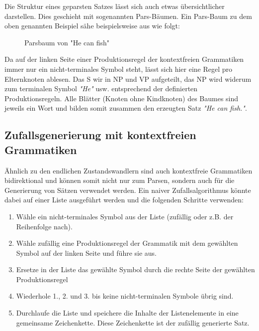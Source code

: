 \documentclass[12pt]{report}
\begin{document}
Die Struktur eines geparsten Satzes lässt sich auch etwas übersichtlicher darstellen. Dies geschieht mit sogenannten Pars-Bäumen. Ein Pars-Baum zu dem oben genannten Beispiel sähe beispielsweise aus wie folgt:
\begin{figure}
\begin{center}
\caption{Parsbaum von "He can fish"}
\end{center}
\end{figure}

Da auf der linken Seite einer Produktionsregel der kontextfreien Grammatiken immer nur ein nicht-terminales Symbol steht, lässt sich hier eine Regel pro Elternknoten ablesen. Das S wir in NP und VP aufgeteilt, das NP wird widerum zum terminalen Symbol \textit{"He"} usw. entsprechend der definierten Produktionsregeln. Alle Blätter (Knoten ohne Kindknoten) des Baumes sind jeweils ein Wort und bilden somit zusammen den erzeugten Satz \textit{"He can fish."}. 

\subsection{Zufallsgenerierung mit kontextfreien Grammatiken}

Ähnlich zu den endlichen Zustandswandlern sind auch kontextfreie Grammatiken bidirektional und können somit nicht nur zum Parsen, sondern auch für die Generierung von Sätzen verwendet werden. 
Ein naiver Zufallsalgorithmus könnte dabei auf einer Liste ausgeführt werden und die folgenden Schritte verwenden:

\begin{enumerate}
\item Wähle ein nicht-terminales Symbol aus der Liste (zufällig oder z.B. der Reihenfolge nach).
\item Wähle zufällig eine Produktionsregel der Grammatik mit dem gewählten Symbol auf der linken Seite und führe sie aus. 
\item Ersetze in der Liste das gewählte Symbol durch die rechte Seite der gewählten Produktionsregel
\item Wiederhole 1., 2. und 3. bis keine nicht-terminalen Symbole übrig sind. 
\item Durchlaufe die Liste und speichere die Inhalte der Listenelemente in eine gemeinsame Zeichenkette. Diese Zeichenkette ist der zufällig generierte Satz. 
\end{enumerate}
\end{document}
